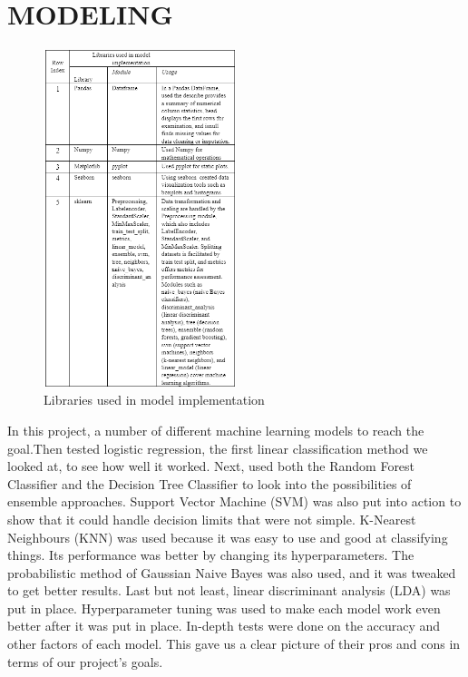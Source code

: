 \section{MODELING}
\begin{figure}[h]
    \centering
    \includegraphics[width=0.5\textwidth]{Screenshot 2023-12-11 020534.png}
    \caption{Libraries used in model implementation}
    \label{fig:my_label}

\end{figure}

In this project,  a number of different machine learning models to reach the goal.Then tested logistic regression, the first linear classification method we looked at, to see how well it worked. Next, used both the Random Forest Classifier and the Decision Tree Classifier to look into the possibilities of ensemble approaches. Support Vector Machine (SVM) was also put into action to show that it could handle decision limits that were not simple. K-Nearest Neighbours (KNN) was used because it was easy to use and good at classifying things. Its performance was better by changing its hyperparameters. The probabilistic method of Gaussian Naive Bayes was also used, and it was tweaked to get better results. Last but not least, linear discriminant analysis (LDA) was put in place. Hyperparameter tuning was used to make each model work even better after it was put in place. In-depth tests were done on the accuracy and other factors of each model. This gave us a clear picture of their pros and cons in terms of our project's goals.

